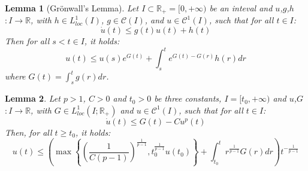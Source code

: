 \documentclass[reqno]{amsart}
\theoremstyle{plain}
\newtheorem{lemma}{Lemma}	%
\theoremstyle{definition}
\theoremstyle{remark}
\newcommand{\R}{\mathbb{R}}	%
\begin{document}
\begin{lemma}[Gr\"onwall's Lemma]\label{lemmagronwallcontinuous}
	Let $I\subset \R_{+}=[0,+\infty)$ be an inteval and $u$,$g$,$h$ $:I\longrightarrow \R$, with $h\in L^{1}_{loc}(I)$, $g\in \mathcal{C}(I)$, and $u\in\mathcal{C}^{1}(I)$, such that for all $t\in I$: \begin{equation}\label{gronwalhypothesis}\dot{u}(t)\leq g(t)u(t)+h(t)
	\end{equation}
	Then for all $s<t\in I$, it holds: \begin{equation}\label{gronwalconclusion}
		u(t)\leq u(s)e^{G(t)}+\int_{s}^{t}e^{G(t)-G(r)}h(r)dr
	\end{equation}
	where $G(t)=\int_{s}^{t}g(r)dr$.
\end{lemma}

\begin{lemma}\label{lemma nonlinear gronwall power p}
Let $p>1$, $C>0$ and $t_{0}>0$ be three constants, $I=[t_{0},+\infty)$ and $u$,$G$ $:I\longrightarrow \R$, with $G\in L^{1}_{loc}(I;\R_{+})$ and $u\in\mathcal{C}^{1}(I)$, such that for all $t\in I$:
	\begin{equation}\label{relation nonlinear gronwall appendix}
		\dot{u}(t) \leq G(t) - Cu^{p}(t)
	\end{equation}
	Then, for all $t\geq t_{0}$, it holds:
\begin{equation}\label{bound nonlinear gronwall appendix}
	u(t) \leq \left(\max\left\{ \left(\frac{1}{C(p-1)}\right)^{\frac{1}{p-1}}, t_{0}^{\frac{1}{p-1}}u(t_{0}) \right\} + \int_{t_{0}}^{t}r^{\frac{1}{p-1}}G(r)dr \right)t^{-\frac{1}{p-1}}
\end{equation}
\end{lemma}
\end{document}
